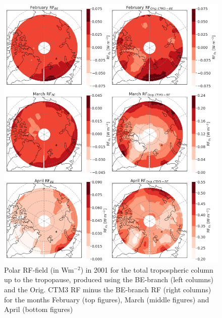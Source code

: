 \begin{figure}[ht]
    \centering
    \includegraphics[width = \linewidth]{Chapter6_Results/images/RF/RF_USE/BEOrig_RF_polar_FebApr_2001.png}
    \caption{Polar RF-field (in Wm$^{-2}$) in 2001 for the total tropospheric column up to the tropopause, produced using the BE-branch (left columns) and the Orig. CTM3 RF minus the BE-branch RF (right columns) for the months February (top figures), March (middle figures) and April (bottom figures)}
    \label{fig:BEorig_RF_polar_FebApr_2001}
\end{figure}